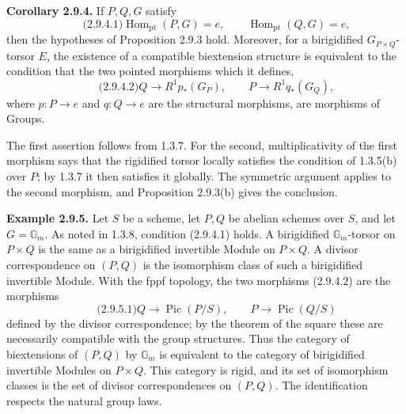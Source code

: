 \documentclass[11pt]{article}
\providecommand{\Pic}{\operatorname{Pic}}
\begin{document}
\textbf{Corollary 2.9.4.}  If \(P,Q,G\) satisfy
\begin{equation}\qquad\text{(2.9.4.1)}
  \operatorname{Hom}_{\mathrm{pt}}(P,G)=e,
  \qquad
  \operatorname{Hom}_{\mathrm{pt}}(Q,G)=e,
\end{equation}
then the hypotheses of Proposition 2.9.3 hold.  Moreover, for a birigidified \(G_{P\times Q}\)-torsor \(E\), the existence of a compatible biextension structure is equivalent to the condition that the two pointed morphisms which it defines,
\begin{equation}\qquad\text{(2.9.4.2)}
  Q\longrightarrow R^1p_*(G_{P}),
  \qquad
  P\longrightarrow R^1q_*(G_{Q}),
\end{equation}
where \(p:P\to e\) and \(q:Q\to e\) are the structural morphisms, are morphisms of Groups.

The first assertion follows from 1.3.7.  For the second, multiplicativity of the first morphism says that the rigidified torsor locally satisfies the condition of 1.3.5(b) over \(P\); by 1.3.7 it then satisfies it globally.  The symmetric argument applies to the second morphism, and Proposition 2.9.3(b) gives the conclusion.

\textbf{Example 2.9.5.}  Let \(S\) be a scheme, let \(P,Q\) be abelian schemes over \(S\), and let \(G=\mathbb G_m\).  As noted in 1.3.8, condition (2.9.4.1) holds.  A birigidified \(\mathbb G_m\)-torsor on \(P\times Q\) is the same as a birigidified invertible Module on \(P\times Q\).  A divisor correspondence on \((P,Q)\) is the isomorphism class of such a birigidified invertible Module.  With the fppf topology, the two morphisms (2.9.4.2) are the morphisms
\begin{equation}\qquad\text{(2.9.5.1)}
  Q\longrightarrow \Pic(P/S),
  \qquad
  P\longrightarrow \Pic(Q/S)
\end{equation}
defined by the divisor correspondence; by the theorem of the square these are necessarily compatible with the group structures.  Thus the category of biextensions of \((P,Q)\) by \(\mathbb G_m\) is equivalent to the category of birigidified invertible Modules on \(P\times Q\).  This category is rigid, and its set of isomorphism classes is the set of divisor correspondences on \((P,Q)\).  The identification respects the natural group laws.
\end{document}
